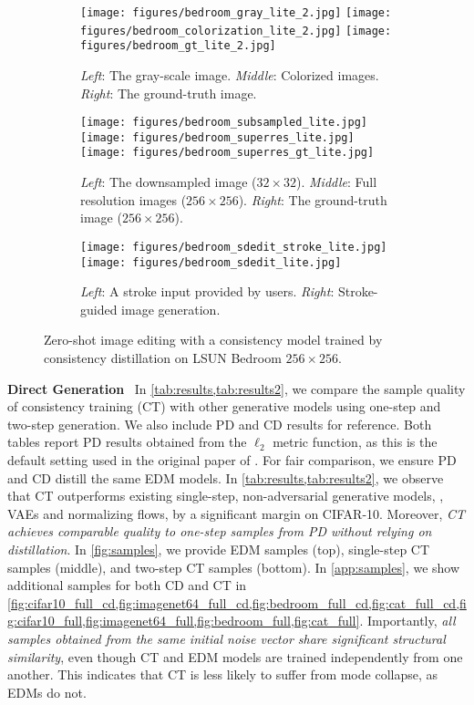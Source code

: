 \begin{figure*}
    \centering
    \begin{subfigure}[b]{\textwidth}
        \texttt{[image: figures/bedroom\_gray\_lite\_2.jpg]}\hfill
        \texttt{[image: figures/bedroom\_colorization\_lite\_2.jpg]}\hfill
        \texttt{[image: figures/bedroom\_gt\_lite\_2.jpg]}
        \caption{\emph{Left}: The gray-scale image. \emph{Middle}: Colorized images. \emph{Right}: The ground-truth image.}
        \label{fig:bedroom_colorization_lite}
    \end{subfigure}
    \begin{subfigure}[b]{\textwidth}
        \texttt{[image: figures/bedroom\_subsampled\_lite.jpg]}\hfill
        \texttt{[image: figures/bedroom\_superres\_lite.jpg]}\hfill
        \texttt{[image: figures/bedroom\_superres\_gt\_lite.jpg]}
        \caption{\emph{Left}: The downsampled image ($32\times 32$). \emph{Middle}: Full resolution images ($256\times 256$). \emph{Right}: The ground-truth image ($256\times 256$).}
        \label{fig:bedroom_superres_lite}
    \end{subfigure}
    \begin{subfigure}[b]{\textwidth}
        \texttt{[image: figures/bedroom\_sdedit\_stroke\_lite.jpg]}\hfill
        \texttt{[image: figures/bedroom\_sdedit\_lite.jpg]}
        \caption{\emph{Left}: A stroke input provided by users. \emph{Right}: Stroke-guided image generation.}
        \label{fig:bedroom_sdedit_lite}
    \end{subfigure}
    \caption{Zero-shot image editing with a consistency model trained by consistency distillation on LSUN Bedroom $256\times 256$.}
\end{figure*}


\textbf{Direct Generation}~ In \cref{tab:results,tab:results2}, we compare the sample quality of consistency training (CT) with other generative models using one-step and two-step generation. We also include PD and CD results for reference. Both tables report PD results obtained from the $\ell_2$ metric function, as this is the default setting used in the original paper of \citet{salimans2022progressive}. For fair comparison, we ensure PD and CD distill the same EDM models. In \cref{tab:results,tab:results2}, we observe that CT outperforms existing single-step, non-adversarial generative models, \ie, VAEs and normalizing flows, by a significant margin on CIFAR-10.
Moreover, \emph{CT achieves comparable quality to one-step samples from PD without relying on distillation}. In \cref{fig:samples}, we provide EDM samples (top), single-step CT samples (middle), and two-step CT samples (bottom). In \cref{app:samples}, we show additional samples for both CD and CT in \cref{fig:cifar10_full_cd,fig:imagenet64_full_cd,fig:bedroom_full_cd,fig:cat_full_cd,fig:cifar10_full,fig:imagenet64_full,fig:bedroom_full,fig:cat_full}. Importantly, \emph{all samples obtained from the same initial noise vector share significant structural similarity}, even though CT and EDM models are trained independently from one another. This indicates that CT is less likely to suffer from mode collapse, as EDMs do not.


